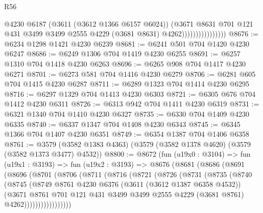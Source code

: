 \begin{lexlean}{R56}
\begin{coremodule}
                                  @4230
                                  @6187
                                  (@3611 (@3612 @1366 @6157 @6024))
                                  (@3671
                                    @8631
                                    @701
                                    @121
                                    @431
                                    @3499
                                    @3499
                                    @2555
                                    @4229
                                    (@3681 @8631)
                                    @4262))))))))))))))))
@8676 := @6234 @1298 @1421 @4230 @6239
@8681 := @6241 @501 @704 @1420 @4230 @6247
@8686 := @6249 @1306 @704 @1419 @4230 @6255
@8691 := @6257 @1310 @704 @1418 @4230 @6263
@8696 := @6265 @908 @704 @1417 @4230 @6271
@8701 := @6273 @581 @704 @1416 @4230 @6279
@8706 := @6281 @605 @704 @1415 @4230 @6287
@8711 := @6289 @1323 @704 @1414 @4230 @6295
@8716 := @6297 @1329 @704 @1413 @4230 @6303
@8721 := @6305 @676 @704 @1412 @4230 @6311
@8726 := @6313 @942 @704 @1411 @4230 @6319
@8731 := @6321 @1340 @704 @1410 @4230 @6327
@8735 := @6330 @704 @1409 @4230 @6335
@8740 := @6337 @1347 @704 @1408 @4230 @6343
@8745 := @6345 @1366 @704 @1407 @4230 @6351
@8749 := @6354 @1387 @704 @1406 @6358
@8761 := @3579 (@3582 @1383 @4363) (@3579 (@3582 @1378 @4620) (@3579 (@3582 @1373 @3477) @4532))
@8800 := @8672
    (fun (u19x0 : @3104) =>
    fun (u19x1 : @3193) =>
    fun (u19x2 : @3193) =>
    @8676
      (@8681
        (@8686
          (@8691
            (@8696
              (@8701
                (@8706
                  (@8711
                    (@8716
                      (@8721
                        (@8726
                          (@8731
                            (@8735
                              (@8740
                                (@8745
                                  (@8749
                                    @8761
                                    @4230
                                    @6376
                                    (@3611 (@3612 @1387 @6358 @4532))
                                    (@3671
                                      @8761
                                      @701
                                      @121
                                      @431
                                      @3499
                                      @3499
                                      @2555
                                      @4229
                                      (@3681 @8761)
                                      @4262)))))))))))))))))

\end{coremodule}
\end{lexlean}
